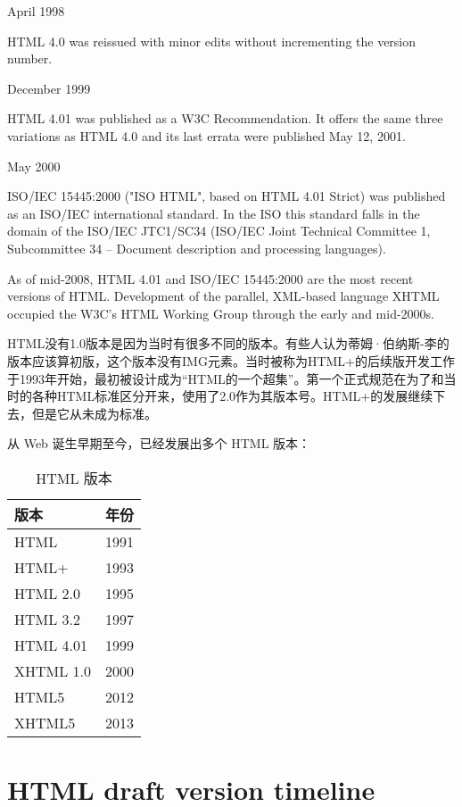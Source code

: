 \begin{compactitem}
\item April 1998

HTML 4.0 was reissued with minor edits without incrementing the version number.

\item December 1999

HTML 4.01 was published as a W3C Recommendation. It offers the same three variations as HTML 4.0 and its last errata were published May 12, 2001.

\item May 2000

ISO/IEC 15445:2000 ("ISO HTML", based on HTML 4.01 Strict) was published as an ISO/IEC international standard. In the ISO this standard falls in the domain of the ISO/IEC JTC1/SC34 (ISO/IEC Joint Technical Committee 1, Subcommittee 34 – Document description and processing languages).

As of mid-2008, HTML 4.01 and ISO/IEC 15445:2000 are the most recent versions of HTML. Development of the parallel, XML-based language XHTML occupied the W3C's HTML Working Group through the early and mid-2000s.

\end{compactitem}

HTML没有1.0版本是因为当时有很多不同的版本。有些人认为蒂姆·伯纳斯-李的版本应该算初版，这个版本没有IMG元素。当时被称为HTML+的后续版开发工作于1993年开始，最初被设计成为“HTML的一个超集”。第一个正式规范在为了和当时的各种HTML标准区分开来，使用了2.0作为其版本号。HTML+的发展继续下去，但是它从未成为标准。

从 Web 诞生早期至今，已经发展出多个 HTML 版本：

\begin{table}[!h]
\centering
\caption{HTML 版本}
\begin{tabular}{|l|l|}
\hline
版本			&年份\\
\hline
HTML		&1991\\
\hline
HTML+		&1993\\
\hline
HTML 2.0	&1995\\
\hline
HTML 3.2	&1997\\
\hline
HTML 4.01	&1999\\
\hline
XHTML 1.0	&2000\\
\hline
HTML5		&2012\\
\hline
XHTML5		&2013\\
\hline
\end{tabular}
\end{table}

\section{HTML draft version timeline}


